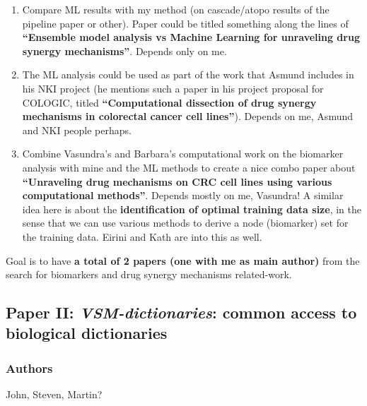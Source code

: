 \documentclass[12pt,]{book}
\providecommand{\tightlist}{%
  \setlength{\itemsep}{0pt}\setlength{\parskip}{0pt}}
\begin{document}
\begin{enumerate}
\def\labelenumi{\arabic{enumi}.}
\tightlist
\item
  Compare ML results with my method (on cascade/atopo results of the pipeline
  paper or other). Paper could be titled something along the lines of
  \textbf{``Ensemble model analysis vs Machine Learning for unraveling drug synergy mechanisms''}.
  Depends only on me.
\item
  The ML analysis could be used as part of the work that Asmund includes in his NKI project (he mentions such a paper in his project proposal for COLOGIC, titled \textbf{``Computational dissection of drug synergy mechanisms in colorectal cancer cell lines''}). Depends on me, Asmund and NKI
  people perhaps.
\item
  Combine Vasundra's and Barbara's computational work on the biomarker analysis with mine and the ML methods to create a nice combo paper about
  \textbf{``Unraveling drug mechanisms on CRC cell lines using various computational methods''}.
  Depends mostly on me, Vasundra! A similar idea here is about the
  \textbf{identification of optimal training data size}, in the sense that we can use various methods to derive a node (biomarker) set for the training data. Eirini and Kath are into this as well.
\end{enumerate}

Goal is to have \textbf{a total of 2 papers (one with me as main author)} from the search for biomarkers and drug
synergy mechanisms related-work.

\hypertarget{paper-ii-vsm-dictionaries-common-access-to-biological-dictionaries}{%
\subsection*{\texorpdfstring{Paper II: \emph{VSM-dictionaries}: common access to biological dictionaries}{Paper II: VSM-dictionaries: common access to biological dictionaries}}\label{paper-ii-vsm-dictionaries-common-access-to-biological-dictionaries}}

\hypertarget{authors-1}{%
\subsubsection*{Authors}\label{authors-1}}

John, Steven, Martin?
\end{document}
